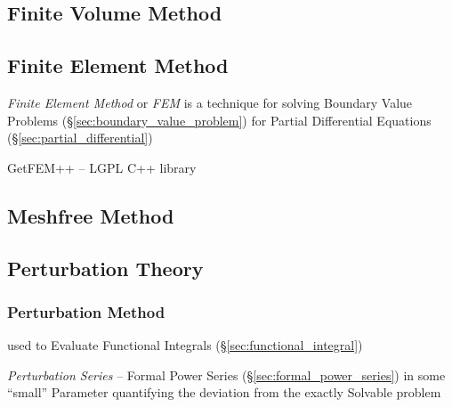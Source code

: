 \subsection{Finite Volume Method}\label{sec:finite_volume_method}

\subsection{Finite Element Method}\label{sec:finite_element_method}

\emph{Finite Element Method} or \emph{FEM} is a technique for solving Boundary
Value Problems (\S\ref{sec:boundary_value_problem}) for Partial Differential
Equations (\S\ref{sec:partial_differential})

GetFEM++ -- LGPL C++ library



\subsection{Meshfree Method}\label{sec:meshfree_method}

\subsection{Perturbation Theory}\label{sec:perturbation_theory}

\subsubsection{Perturbation Method}\label{sec:perturbation_method}

used to Evaluate Functional Integrals (\S\ref{sec:functional_integral})

\emph{Perturbation Series} -- Formal Power Series
(\S\ref{sec:formal_power_series}) in some ``small'' Parameter quantifying the
deviation from the exactly Solvable problem



